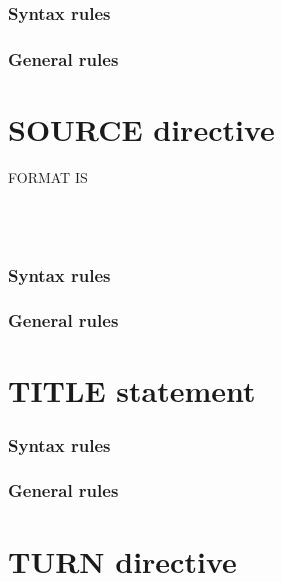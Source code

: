 \subsubsection{Syntax rules}

\subsubsection{General rules}

\section{SOURCE directive}

\begin{syntax}
  \directiveindicator{} FORMAT IS
  \begin{1=}
     \\
     \\
  \end{1=}
\end{syntax}

\subsubsection{Syntax rules}

\subsubsection{General rules}

\section{TITLE statement}

\begin{syntax}[\miscextcolour]
   \literal
\end{syntax}

\subsubsection{Syntax rules}

\subsubsection{General rules}

\section{TURN directive}

